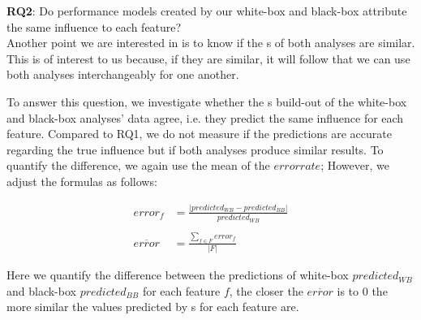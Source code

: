 \noindent \textbf{RQ2}: Do performance models created by our white-box and black-box attribute the same influence to each feature?\\

Another point we are interested in is to know if the {\perfInfluenceModel}s of both analyses are similar. 
This is of interest to us because, if they are similar, it will follow that we can use both analyses interchangeably for one another.

To answer this question, we investigate whether the {\perfInfluenceModel}s build-out of the white-box and black-box analyses' data agree, i.e.
they predict the same influence for each feature. 
Compared to RQ1, we do not measure if the predictions are accurate regarding the true influence but if both analyses produce similar results. 
To quantify the difference, we again use the mean of the $error rate$; However, we adjust the formulas as follows:

\begin{align}
    error_f &= \frac{\lvert predicted_{WB} - predicted_{BB} \rvert}{predicted_{WB}} \label{equ:APE_RQ1} \\ \nonumber \\
    \overline{error}  &= \frac{\sum_{f \in F} error_f}{\lvert F \rvert} \label{equ:MAPE_RQ1}
\end{align}

Here we quantify the difference between the predictions of white-box $predicted_{WB}$ and black-box $predicted_{BB}$ for each feature $f$, 
the closer the $\overline{error}$ is to $0$ the more similar the values predicted by {\perfInfluenceModel}s for each feature are.\\


